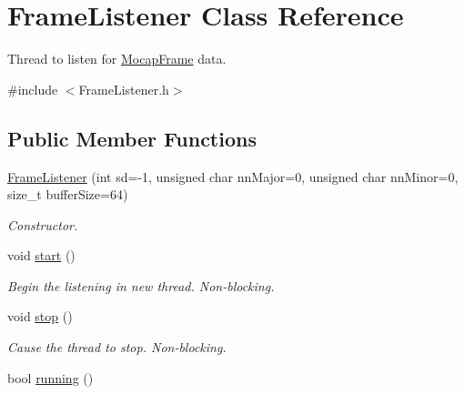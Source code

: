 \hypertarget{classFrameListener}{\section{\-Frame\-Listener \-Class \-Reference}
\label{classFrameListener}
}


\-Thread to listen for \hyperlink{classMocapFrame}{\-Mocap\-Frame} data.  




{\ttfamily \#include $<$\-Frame\-Listener.\-h$>$}

\subsection*{\-Public \-Member \-Functions}
\begin{DoxyCompactItemize}
\item 
\hyperlink{classFrameListener_a8e0bb687e9b09dc7b4e0b5dd7472e243}{\-Frame\-Listener} (int sd=-\/1, unsigned char nn\-Major=0, unsigned char nn\-Minor=0, size\-\_\-t buffer\-Size=64)
\begin{DoxyCompactList}\small\item\em \-Constructor. \end{DoxyCompactList}\item 
\hypertarget{classFrameListener_a6475196523f3e1dea5caf3a3abfb010b}{void \hyperlink{classFrameListener_a6475196523f3e1dea5caf3a3abfb010b}{start} ()}\label{classFrameListener_a6475196523f3e1dea5caf3a3abfb010b}

\begin{DoxyCompactList}\small\item\em \-Begin the listening in new thread. \-Non-\/blocking. \end{DoxyCompactList}\item 
\hypertarget{classFrameListener_a70be59362226bcf428b426ef137b32d3}{void \hyperlink{classFrameListener_a70be59362226bcf428b426ef137b32d3}{stop} ()}\label{classFrameListener_a70be59362226bcf428b426ef137b32d3}

\begin{DoxyCompactList}\small\item\em \-Cause the thread to stop. \-Non-\/blocking. \end{DoxyCompactList}\item 
\hypertarget{classFrameListener_a88c18f95e806f091162b627876f47c0a}{bool \hyperlink{classFrameListener_a88c18f95e806f091162b627876f47c0a}{running} ()}\label{classFrameListener_a88c18f95e806f091162b627876f47c0a}


\end{DoxyCompactItemize}
